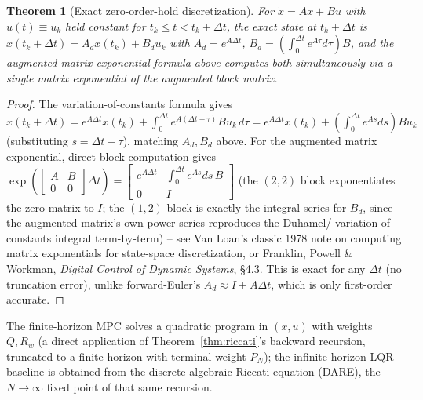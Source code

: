 \documentclass[11pt]{report}
\theoremstyle{plain}
\newtheorem{theorem}{Theorem}[chapter]
\theoremstyle{definition}
\theoremstyle{remark}
\begin{document}
\begin{theorem}[Exact zero-order-hold discretization]
\label{thm:zoh}
For $\dot x=Ax+Bu$ with $u(t)\equiv u_k$ held constant for
$t_k\le t<t_k+\Delta t$, the exact state at $t_k+\Delta t$ is
$x(t_k+\Delta t)=A_dx(t_k)+B_du_k$ with $A_d=e^{A\Delta t}$,
$B_d=\left(\int_0^{\Delta t}e^{A\tau}d\tau\right)B$, and
the augmented-matrix-exponential formula above computes both simultaneously via a single matrix
exponential of the augmented block matrix.
\end{theorem}
\begin{proof}
The variation-of-constants formula gives $x(t_k+\Delta t)=
e^{A\Delta t}x(t_k)+\int_0^{\Delta t}e^{A(\Delta t-\tau)}Bu_k\,d\tau=
e^{A\Delta t}x(t_k)+\left(\int_0^{\Delta t}e^{As}ds\right)Bu_k$ (substituting
$s=\Delta t-\tau$), matching $A_d,B_d$ above. For the augmented matrix
exponential, direct block computation gives
$\exp\left(\begin{bmatrix}A&B\\0&0\end{bmatrix}\Delta t\right)=
\begin{bmatrix}e^{A\Delta t} & \int_0^{\Delta t}e^{As}ds\,B\\ 0 &
I\end{bmatrix}$ (the $(2,2)$ block exponentiates the zero matrix to
$I$; the $(1,2)$ block is exactly the integral series for $B_d$, since
the augmented matrix's own power series reproduces the Duhamel/
variation-of-constants integral term-by-term) -- see Van Loan's classic
1978 note on computing matrix exponentials for state-space
discretization, or Franklin, Powell \& Workman, \emph{Digital Control
of Dynamic Systems}, \S4.3. This is exact for any $\Delta t$ (no
truncation error), unlike forward-Euler's $A_d\approx I+A\Delta t$,
which is only first-order accurate.
\end{proof}

The finite-horizon MPC solves a quadratic program in $(x,u)$ with
weights $Q,R_w$ (a direct application of Theorem~\ref{thm:riccati}'s
backward recursion, truncated to a finite horizon with terminal weight
$P_N$); the infinite-horizon LQR baseline is obtained from the discrete
algebraic Riccati equation (DARE), the $N\to\infty$ fixed point of that
same recursion.
\end{document}
